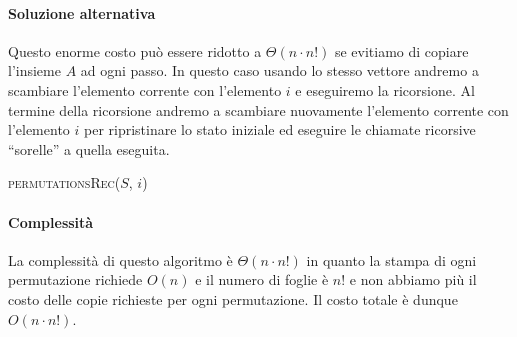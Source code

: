             \paragraph{Soluzione alternativa} Questo enorme costo può essere ridotto a $\Theta(n \cdot n!)$ se evitiamo di copiare l'insieme $A$ ad ogni passo. In questo caso usando lo stesso vettore andremo a scambiare l'elemento corrente con l'elemento $i$ e eseguiremo la ricorsione. Al termine della ricorsione andremo a scambiare nuovamente l'elemento corrente con l'elemento $i$ per ripristinare lo stato iniziale ed eseguire le chiamate ricorsive ``sorelle'' a quella eseguita.
            \begin{algorithm}[H]
                \caption{\textsc{permutationsRec}(\Item[] $S$, \Int $i$)}
                \begin{algorithmic}
                     
                        \State {}
                    \Else
                            \State {}
                            \State {}
                            \State {} 
                        \EndFor
                    \EndIf
                \end{algorithmic}
            \end{algorithm}
            \paragraph{Complessità} La complessità di questo algoritmo è $\Theta(n \cdot n!)$ in quanto la stampa di ogni permutazione richiede $O(n)$ e il numero di foglie è $n!$ e non abbiamo più il costo delle copie richieste per ogni permutazione. Il costo totale è dunque $O(n \cdot n!)$.
